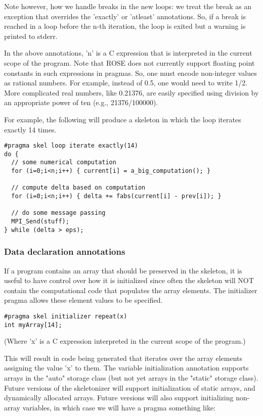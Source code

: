 Note however, how we handle breaks in the new loops: we treat the break as an
exception that overrides the 'exactly' or 'atleast' annotations.  So, if a break
is reached in a loop before the n-th iteration, the loop is exited but a warning
is printed to stderr.

In the above annotations, 'n' is a C expression that is interpreted in the
current scope of the program.
Note that ROSE does not currently support floating point constants in
such expressions in pragmas.
So, one must encode non-integer values as rational numbers.
For example, instead of 0.5, one would need to write 1/2.  More
complicated real numbers, like 0.21376, are easily specified using
division by an appropriate power of ten (e.g., 21376/100000).

For example, the following will produce a skeleton
in which the loop iterates exactly 14 times.

\begin{verbatim}
#pragma skel loop iterate exactly(14)
do {
  // some numerical computation
  for (i=0;i<n;i++) { current[i] = a_big_computation(); }

  // compute delta based on computation
  for (i=0;i<n;i++) { delta += fabs(current[i] - prev[i]); }

  // do some message passing
  MPI_Send(stuff);
} while (delta > eps);
\end{verbatim}

\subsubsection{Data declaration annotations}

If a program contains an array that should be preserved in the
skeleton, it is useful to have control over how it is initialized
since often the skeleton will NOT contain the computational code that
populates the array elements.  The initializer pragma allows these
element values to be specified.

\begin{verbatim}
#pragma skel initializer repeat(x)
int myArray[14];
\end{verbatim}

(Where 'x' is a C expression interpreted in the current scope of the program.)

This will result in code being generated that iterates over the array
elements assigning the value 'x' to them.  The variable initialization
annotation supports arrays in the "auto" storage class (but not yet
arrays in the "static" storage class).
Future versions of the skeletonizer will support
initialization of static arrays, and dynamically
allocated arrays.
Future versions will also support initializing non-array variables,
in which case we will have a pragma something like:

